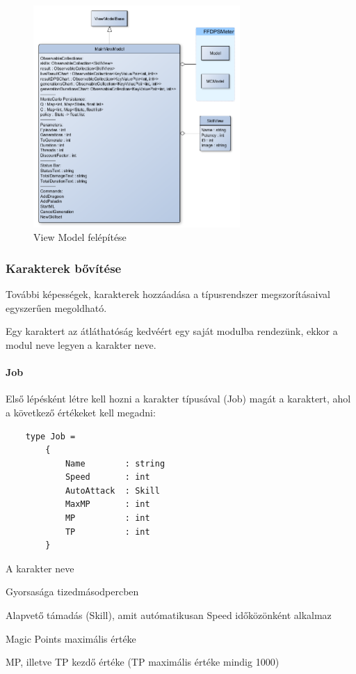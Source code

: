 \documentclass[12pt]{article}
\begin{document}
	\begin{figure}[H]
		\begin{center}
			\includegraphics[width=0.7\textwidth]{viewmodel}
		\end{center}
		\caption{View Model felépítése}
		\label{fig:viewmodel}
	\end{figure}
	
	\subsubsection{Karakterek bővítése}
	
	További képességek, karakterek hozzáadása a típusrendszer megszorításaival egyszerűen megoldható.
	
	Egy karaktert az átláthatóság kedvéért egy saját modulba rendezünk, ekkor a modul neve legyen a karakter neve.
	
	\paragraph{Job} Első lépésként létre kell hozni a karakter típusával (Job) magát a karaktert, ahol a következő értékeket kell megadni:
	
	\begin{lstlisting}
	type Job =
		{
			Name        : string
			Speed       : int
			AutoAttack  : Skill
			MaxMP       : int
			MP          : int
			TP          : int
		}
	\end{lstlisting}
	
	\begin{description}[align=left,labelwidth=2.5cm]
		\item [Name] A karakter neve
		\item [Speed] Gyorsasága tizedmásodpercben
		\item [AutoAttack] Alapvető támadás (Skill), amit autómatikusan Speed időközönként alkalmaz
		\item [MaxMP] Magic Points maximális értéke
		\item [MP, TP] MP, illetve TP kezdő értéke (TP maximális értéke mindig 1000)
	\end{description}
	
\end{document}
